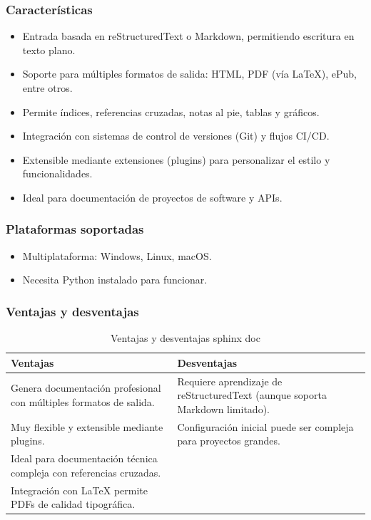 \documentclass[man, floatsintext]{apa7}
\begin{document}
	\subsubsection{Características}
		\begin{itemize}
		\item Entrada basada en reStructuredText o Markdown, permitiendo escritura en texto plano.
		\item Soporte para múltiples formatos de salida: HTML, PDF (vía LaTeX), ePub, entre otros.
		\item Permite índices, referencias cruzadas, notas al pie, tablas y gráficos.
		\item Integración con sistemas de control de versiones (Git) y flujos CI/CD.
		\item Extensible mediante extensiones (plugins) para personalizar el estilo y funcionalidades.
		\item Ideal para documentación de proyectos de software y APIs.
	\end{itemize}

	\subsubsection*{Plataformas soportadas}
		\begin{itemize}
		\item Multiplataforma: Windows, Linux, macOS.
		\item Necesita Python instalado para funcionar.
	\end{itemize}

	\subsubsection{Ventajas y desventajas}\cite{molyneaux2024python_docs}
	\begin{table}[h!]
		\centering
		\begin{tabular}{|p{5cm}|p{9cm}|}
			\hline
		\textbf{Ventajas} & \textbf{Desventajas} \\ \hline
		Genera documentación profesional con múltiples formatos de salida. & Requiere aprendizaje de reStructuredText (aunque soporta Markdown limitado). \\ \hline
		Muy flexible y extensible mediante plugins. & Configuración inicial puede ser compleja para proyectos grandes. \\ \hline
		Ideal para documentación técnica compleja con referencias cruzadas. & \\ \hline
		Integración con LaTeX permite PDFs de calidad tipográfica. & \\ \hline
		\end{tabular}
		\caption{Ventajas y desventajas sphinx doc}
		
	\end{table}
	\FloatBarrier
\end{document}
